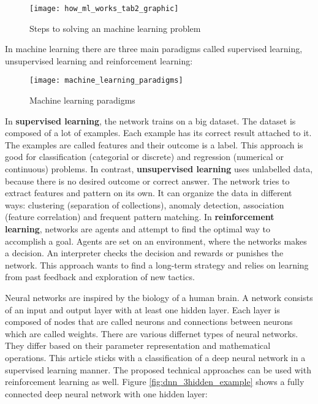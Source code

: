 \begin{figure}[H]
    \centering
    \texttt{[image: how\_ml\_works\_tab2\_graphic]}
    \caption{\cite{tf_ml_steps_pipline} Steps to solving an machine learning problem}
    \label{fig:ml_steps_pipeline}
\end{figure}

In machine learning there are three main paradigms called supervised learning, unsupervised learning and reinforcement learning:

\begin{figure}[H]
    \centering
    \texttt{[image: machine\_learning\_paradigms]}
    \caption{\cite{ml_paradigms_image} Machine learning paradigms}
    \label{fig:ml_paradigms_image}
\end{figure}

In \textbf{supervised learning}, the network trains on a big dataset.
The dataset is composed of a lot of examples.
Each example has its correct result attached to it.
The examples are called features and their outcome is a label.
This approach is good for classification (categorial or discrete) and regression (numerical or continuous) problems.
\cite{nvidia_paradigms_blog}
\hfill \break
In contrast, \textbf{unsupervised learning} uses unlabelled data, because there is no desired outcome or correct answer.
The network tries to extract features and pattern on its own.
It can organize the data in different ways: clustering (separation of collections), anomaly detection, association
(feature correlation) and frequent pattern matching.
\cite{nvidia_paradigms_blog}
\hfill \break
In \textbf{reinforcement learning}, networks are agents and attempt to find the optimal way to accomplish a goal.
Agents are set on an environment, where the networks makes a decision.
An interpreter checks the decision and rewards or punishes the network.
This approach wants to find a long-term strategy and relies on learning from past feedback and exploration of new tactics.
\cite{nvidia_paradigms_blog}

Neural networks are inspired by the biology of a human brain.
A network consists of an input and output layer with at least one hidden layer.
Each layer is composed of nodes that are called neurons and connections between neurons which are called weights.
There are various differnet types of neural networks.
They differ based on their parameter representation and mathematical operations.
This article sticks with a classification of a deep neural network in a supervised learning manner.
The proposed technical approaches can be used with reinforcement learning as well.
Figure \ref{fig:dnn_3hidden_example} shows a fully connected deep neural network with one hidden layer:
\cite{nvidia-ai-explained, tensorflow-about}

